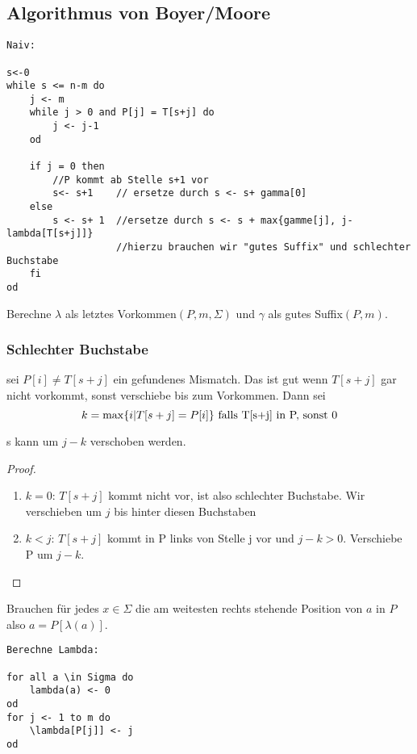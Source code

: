     \subsection{Algorithmus von Boyer/Moore}
\begin{verbatim}
Naiv:

s<-0
while s <= n-m do
    j <- m
    while j > 0 and P[j] = T[s+j] do
        j <- j-1
    od
    
    if j = 0 then
        //P kommt ab Stelle s+1 vor
        s<- s+1    // ersetze durch s <- s+ gamma[0]
    else
        s <- s+ 1  //ersetze durch s <- s + max{gamme[j], j-lambda[T[s+j]]}
                   //hierzu brauchen wir "gutes Suffix" und schlechter Buchstabe
    fi
od      
\end{verbatim}
        Berechne $\lambda$ als letztes Vorkommen$(P,m,\Sigma)$ und $\gamma$ als gutes Suffix$(P,m)$.
        
        \subsubsection{Schlechter Buchstabe}
            sei $P[i] \neq T[s+j]$ ein gefundenes Mismatch. Das ist gut wenn $T[s+j]$ gar nicht vorkommt, sonst verschiebe bis zum Vorkommen. Dann sei
            $$
                k = \max \{i | T[s+j] = P[i]\} \text{ falls T[s+j] in P, sonst } 0
            $$
            \begin{lemma}
                s kann um $j-k$ verschoben werden.
            \end{lemma}
            \begin{proof}
                \begin{enumerate}
                    \item $k=0$: $T[s+j]$ kommt nicht vor, ist also schlechter Buchstabe. Wir verschieben um $j$ bis hinter diesen Buchstaben
                    \item $k<j$: $T[s+j]$ kommt in P links von Stelle j vor und $j-k>0$. Verschiebe P um $j-k$.
                \end{enumerate}
            \end{proof}
            Brauchen für jedes $x \in \Sigma$ die am weitesten rechts stehende Position von $a$ in $P$ also $a = P[\lambda(a)]$.
\begin{verbatim}
Berechne Lambda:

for all a \in Sigma do
    lambda(a) <- 0
od
for j <- 1 to m do
    \lambda[P[j]] <- j
od
\end{verbatim}

